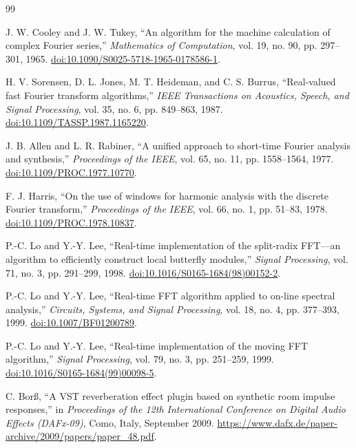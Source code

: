 \begin{thebibliography}{99}
\small\raggedright
{}
J. W. Cooley and J. W. Tukey, ``An algorithm for the machine calculation of
complex Fourier series,'' \emph{Mathematics of Computation}, vol. 19, no. 90,
pp. 297--301, 1965. \href{https://doi.org/10.1090/S0025-5718-1965-0178586-1}{doi:10.1090/S0025-5718-1965-0178586-1}.

H. V. Sorensen, D. L. Jones, M. T. Heideman, and C. S. Burrus,
``Real-valued fast Fourier transform algorithms,'' \emph{IEEE Transactions
on Acoustics, Speech, and Signal Processing}, vol. 35, no. 6, pp. 849--863,
1987. \href{https://doi.org/10.1109/TASSP.1987.1165220}{doi:10.1109/TASSP.1987.1165220}.

J. B. Allen and L. R. Rabiner, ``A unified approach to short-time Fourier
analysis and synthesis,'' \emph{Proceedings of the IEEE}, vol. 65, no. 11,
pp. 1558--1564, 1977.
\href{https://doi.org/10.1109/PROC.1977.10770}{doi:10.1109/PROC.1977.10770}.

F. J. Harris, ``On the use of windows for harmonic analysis with the discrete
Fourier transform,'' \emph{Proceedings of the IEEE}, vol. 66, no. 1,
pp. 51--83, 1978.
\href{https://doi.org/10.1109/PROC.1978.10837}{doi:10.1109/PROC.1978.10837}.

P.-C. Lo and Y.-Y. Lee, ``Real-time implementation of the split-radix FFT---an
algorithm to efficiently construct local butterfly modules,''
\emph{Signal Processing}, vol. 71, no. 3, pp. 291--299, 1998.
\href{https://doi.org/10.1016/S0165-1684(98)00152-2}{doi:10.1016/S0165-1684(98)00152-2}.

P.-C. Lo and Y.-Y. Lee, ``Real-time FFT algorithm applied to on-line spectral
analysis,'' \emph{Circuits, Systems, and Signal Processing}, vol. 18, no. 4,
pp. 377--393, 1999.
\href{https://doi.org/10.1007/BF01200789}{doi:10.1007/BF01200789}.

P.-C. Lo and Y.-Y. Lee, ``Real-time implementation of the moving FFT
algorithm,'' \emph{Signal Processing}, vol. 79, no. 3, pp. 251--259, 1999.
\href{https://doi.org/10.1016/S0165-1684(99)00098-5}{doi:10.1016/S0165-1684(99)00098-5}.

C. Bor\ss{}, ``A VST reverberation effect plugin based on synthetic room
impulse responses,'' in \emph{Proceedings of the 12th International Conference
on Digital Audio Effects (DAFx-09)}, Como, Italy, September 2009.
\url{https://www.dafx.de/paper-archive/2009/papers/paper_48.pdf}.


\end{thebibliography}
